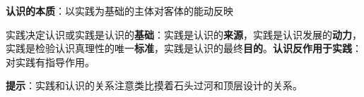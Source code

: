 \textbf{{认识的本质}}：以实践为基础的主体对客体的能动反映

实践决定认识或实践是认识的\textbf{{基础}}：实践是认识的\textbf{{来源}}，实践是认识发展的\textbf{{动力}}，实践是检验认识真理性的唯一\textbf{{标准}}，实践是认识的最终\textbf{{目的}}。\textbf{{认识反作用于实践}}：对实践有指导作用。

\textbf{{提示}}{：实践和认识的关系注意类比摸着石头过河和顶层设计的关系。}
